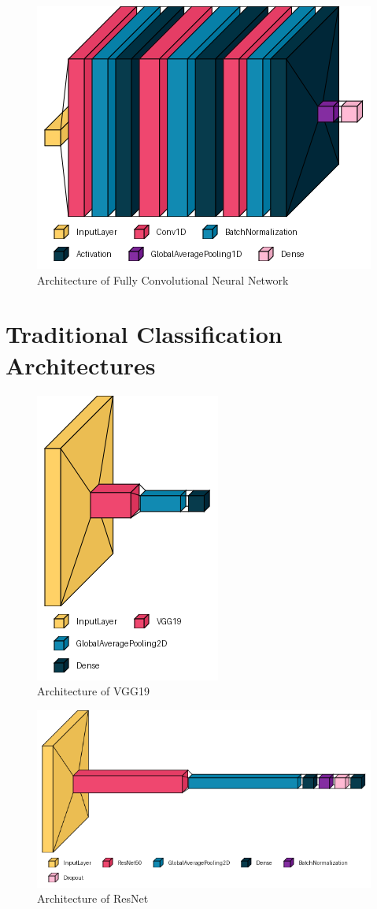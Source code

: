 \begin{figure}
    \centering
    \includegraphics[width=0.5\linewidth]{dissertation//figures/fcnn.png}
    \caption{Architecture of Fully Convolutional Neural Network}
\end{figure}

\chapter{Traditional Classification Architectures}
\label{ch:trad-architectures}

\begin{figure}[H]
    \centering
    \includegraphics[width=0.4\linewidth]{dissertation//figures/vgg19.png}
    \caption{Architecture of VGG19}
\end{figure}

\begin{figure}[H]
    \centering
    \includegraphics[width=1\linewidth]{dissertation//figures/resnet50.png}
    \caption{Architecture of ResNet}
\end{figure}

